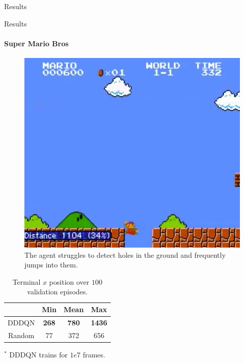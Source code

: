 \documentclass{beamer}
\begin{document}
\begin{frame}{Results}
\end{frame}



\begin{frame}{Results}
\framesubtitle{Super Mario Bros}
\begin{minipage}{\textwidth}
%
\begin{minipage}{0.4\textwidth}
\begin{figure}
\includegraphics[width=\textwidth]{img/smb_clip}
\caption*{The agent struggles to detect holes in the ground and frequently
jumps into them.}
\end{figure}
\end{minipage}
%
\hfill
%
\begin{minipage}{0.5\textwidth}
    \begin{table}
    \centering
    \caption{Terminal $x$ position over $100$ validation episodes.}
    \begin{threeparttable}
    \begin{tabular}{||c c c c||}
    \hline
    & Min & Mean & Max \\ [0.5ex]
    \hline\hline
    DDDQN & \textbf{268} & \textbf{780} & \textbf{1436} \\
    \hline
    Random & 77 & 372 & 656 \\
    \hline
    \end{tabular}
    \begin{tablenotes}
        \small
        \item $^*$ DDDQN trains for $1e7$ frames.
    \end{tablenotes}
    \end{threeparttable}
    \end{table}
\end{minipage}
%
\end{minipage}
\end{frame}
\end{document}
